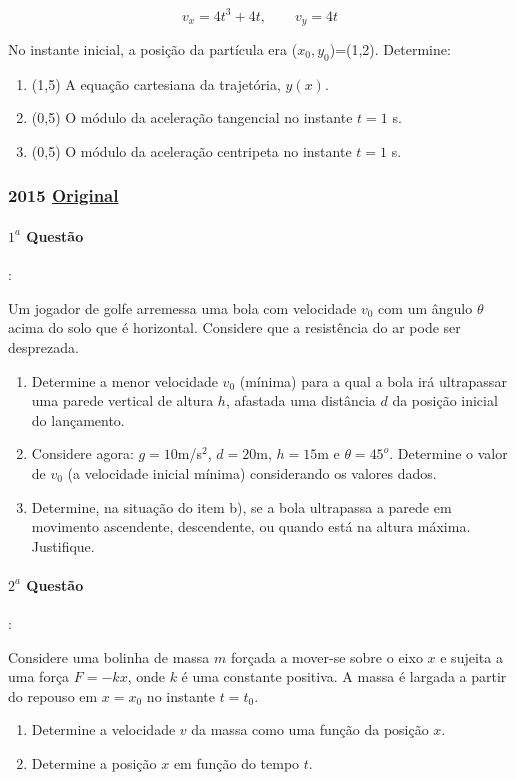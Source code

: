\documentclass[12pt,a4paper]{article}
\newcommand{\original}[1]{\tiny \href{#1}{Original} \normalsize}
\begin{document}
$$v_x=4t^3+4t,\qquad v_y=4t$$

No instante inicial, a posição da partícula era ($x_0,y_0$)=(1,2). Determine:

\begin{enumerate}[label=(\alph*)]

\item (1,5) A equação cartesiana da trajetória, $y(x)$.

\item (0,5) O módulo da aceleração tangencial no instante $t=1$ s.

\item (0,5) O módulo da aceleração centripeta no instante $t=1$ s.

\end{enumerate}
\newpage
\subsubsection{2015 \original{https://drive.google.com/file/d/1HRjfX3TmF9oLu2CmCn0ySnKPe9LkM5U7/view?usp=sharing}}

\paragraph{$1^a$ Questão}:

Um jogador de golfe arremessa uma bola com velocidade $v_0$ com um ângulo $\theta$ acima do solo que é horizontal. Considere que a resistência do ar
pode ser desprezada. 
\begin{enumerate}[label=\alph*)]
\item Determine a menor velocidade $v_0$ (mínima) para a qual a bola irá ultrapassar uma parede vertical de altura $h$, afastada uma distância $d$ da posição inicial do lançamento.
\item Considere agora: $g=10$m/s$^2$, $d=20$m, $h=15$m e $\theta = 45^o$. Determine o valor de $v_0$ (a velocidade inicial mínima) considerando os valores dados.
\item Determine, na situação do item b), se a bola ultrapassa a parede em movimento ascendente, descendente, ou quando está na altura máxima. Justifique.
\end{enumerate}

\paragraph{$2^a$ Questão}:

Considere uma bolinha de massa $m$ forçada a mover-se sobre o eixo $x$ e sujeita a uma força $F=-kx$, onde $k$ é uma constante positiva. A massa é largada a partir do repouso em $x=x_0$ no instante $t=t_0$.
\begin{enumerate}[label=\alph*)]
\item Determine a velocidade $v$ da massa como uma função da posição $x$.
\item Determine a posição $x$ em função do tempo $t$.
\end{enumerate}
\end{document}
